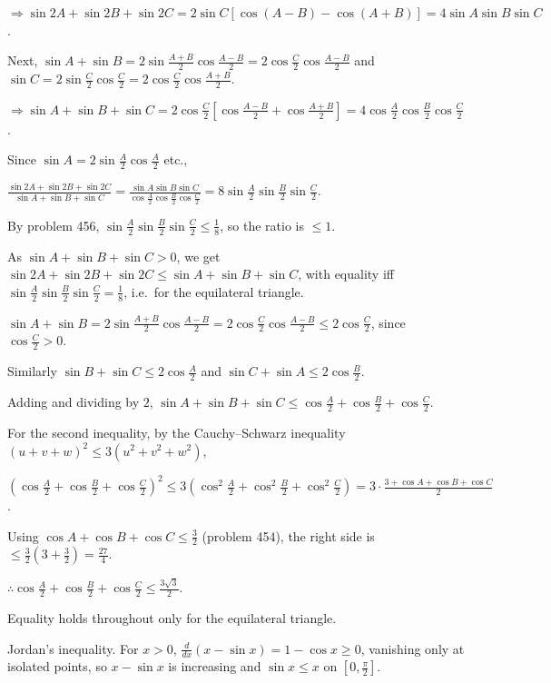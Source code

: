   $\Rightarrow\sin2A + \sin2B + \sin2C = 2\sin C[\cos(A - B) - \cos(A + B)] = 4\sin A\sin B\sin C$.

  Next, $\sin A + \sin B = 2\sin\frac{A + B}{2}\cos\frac{A - B}{2} = 2\cos\frac{C}{2}\cos\frac{A - B}{2}$ and
  $\sin C = 2\sin\frac{C}{2}\cos\frac{C}{2} = 2\cos\frac{C}{2}\cos\frac{A + B}{2}$.

  $\Rightarrow\sin A + \sin B + \sin C = 2\cos\frac{C}{2}\left[\cos\frac{A - B}{2} + \cos\frac{A +
      B}{2}\right] = 4\cos\frac{A}{2}\cos\frac{B}{2}\cos\frac{C}{2}$.

  Since $\sin A = 2\sin\frac{A}{2}\cos\frac{A}{2}$ etc.,

  $\frac{\sin2A + \sin2B + \sin2C}{\sin A + \sin B + \sin C} = \frac{\sin A\sin B\sin
    C}{\cos\frac{A}{2}\cos\frac{B}{2}\cos\frac{C}{2}} = 8\sin\frac{A}{2}\sin\frac{B}{2}\sin\frac{C}{2}$.

  By problem 456, $\sin\frac{A}{2}\sin\frac{B}{2}\sin\frac{C}{2}\leq\frac{1}{8}$, so the ratio is $\leq 1$.

  As $\sin A + \sin B + \sin C > 0$, we get $\sin2A + \sin2B + \sin2C\leq\sin A + \sin B + \sin C$, with
  equality iff $\sin\frac{A}{2}\sin\frac{B}{2}\sin\frac{C}{2} = \frac{1}{8}$, i.e.\ for the equilateral
  triangle.
\item $\sin A + \sin B = 2\sin\frac{A + B}{2}\cos\frac{A - B}{2} = 2\cos\frac{C}{2}\cos\frac{A -
    B}{2}\leq 2\cos\frac{C}{2}$, since $\cos\frac{C}{2} > 0$.

  Similarly $\sin B + \sin C\leq 2\cos\frac{A}{2}$ and $\sin C + \sin A\leq 2\cos\frac{B}{2}$.

  Adding and dividing by $2$, $\sin A + \sin B + \sin C\leq\cos\frac{A}{2} + \cos\frac{B}{2}
  + \cos\frac{C}{2}$.

  For the second inequality, by the Cauchy--Schwarz inequality $(u + v + w)^2\leq 3(u^2 + v^2 + w^2)$,

  $\left(\cos\frac{A}{2} + \cos\frac{B}{2} + \cos\frac{C}{2}\right)^2\leq 3\left(\cos^2\frac{A}{2}
  + \cos^2\frac{B}{2} + \cos^2\frac{C}{2}\right) = 3\cdot\frac{3 + \cos A + \cos B + \cos C}{2}$.

  Using $\cos A + \cos B + \cos C\leq\frac{3}{2}$ (problem 454), the right side is
  $\leq\frac{3}{2}\left(3 + \frac{3}{2}\right) = \frac{27}{4}$.

  $\therefore\cos\frac{A}{2} + \cos\frac{B}{2} + \cos\frac{C}{2}\leq\frac{3\sqrt{3}}{2}$.

  Equality holds throughout only for the equilateral triangle.
\item Jordan's inequality. For $x > 0$, $\frac{d}{dx}(x - \sin x) = 1 - \cos x\geq 0$, vanishing only at
  isolated points, so $x - \sin x$ is increasing and $\sin x\leq x$ on $\left[0, \frac{\pi}{2}\right]$.

